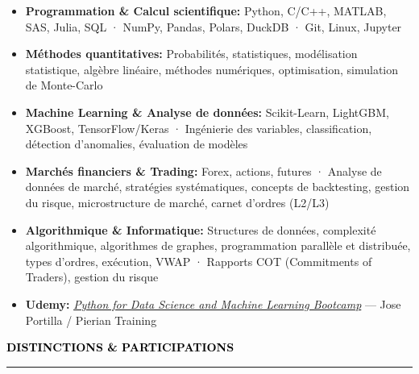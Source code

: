 \documentclass[10pt,english,french]{article}
\newcommand{\awardIcon}[1][black]{\textcolor{#1}{\faTrophy}}
\newcommand{\cvsection}[1]{
    \vspace{4pt}
    \textbf{\fontsize{9pt}{10pt}\selectfont \textcolor{black}{#1}}
    \vspace{6pt}
    \hrule
    \vspace{6pt}
}
\begin{document}
\vspace{-4pt}
\begin{itemize}[leftmargin=0.5cm, label=\textbullet, itemsep=0.12em]

    \item \textbf{Programmation \& Calcul scientifique\!:}
          Python, C/C++, MATLAB, SAS, Julia, SQL ·
          NumPy, Pandas, Polars, DuckDB ·
          Git, Linux, Jupyter

    \item \textbf{Méthodes quantitatives\!:}
          Probabilités, statistiques, modélisation statistique, algèbre linéaire,
          méthodes numériques, optimisation, simulation de Monte-Carlo

    \item \textbf{Machine Learning \& Analyse de données\!:}
          Scikit-Learn, LightGBM, XGBoost, TensorFlow/Keras ·
          Ingénierie des variables, classification, détection d'anomalies,
          évaluation de modèles

    \item \textbf{Marchés financiers \& Trading\!:}
          Forex, actions, futures ·
          Analyse de données de marché, stratégies systématiques, concepts de backtesting,
          gestion du risque, microstructure de marché, carnet d'ordres (L2/L3)

    \item \textbf{Algorithmique \& Informatique\!:}
          Structures de données, complexité algorithmique,
          algorithmes de graphes, programmation parallèle et distribuée, types d'ordres, exécution, VWAP ·
          Rapports COT (Commitments of Traders), gestion du risque


    \item \textbf{Udemy\!:}
          \href{https://www.udemy.com/certificate/UC-51319000-ccb8-4c9c-9320-6cd9860e601c/}
          {\textit{Python for Data Science and Machine Learning Bootcamp}}
          --- Jose Portilla / Pierian Training
\end{itemize}

\vspace{-3pt}
\cvsection{\awardIcon[black]\hspace{4pt}DISTINCTIONS \& PARTICIPATIONS}
\end{document}
